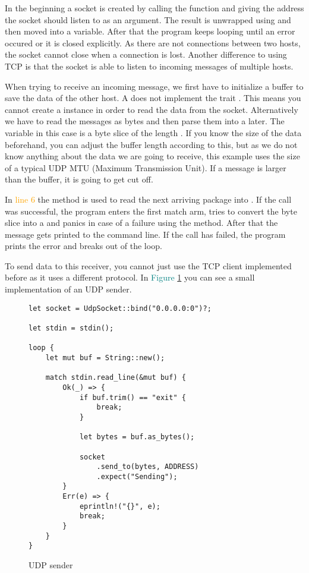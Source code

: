 In the beginning a socket is created by calling the  function and giving the address the socket should listen
to as an argument. The result is unwrapped using  and then moved into a variable. After that the program keeps
looping until an error occured or it is closed explicitly. As there are not connections between two hosts, the socket
cannot close when a connection is lost. Another difference to using TCP is that the socket is able to listen to
incoming messages of multiple hosts.

When trying to receive an incoming message, we first have to initialize a buffer to save the data of the other host.
A  does not implement the trait . This means you cannot create a 
instance in order to read the data from the socket. Alternatively we have to read the messages as bytes and then parse
them into a  later. The variable  in this case is a byte slice of the length . If you
know the size of the data beforehand, you can adjust the buffer length according to this, but as we do not know
anything about the data we are going to receive, this example uses the size of a typical UDP MTU (Maximum Transmission
Unit). If a message is larger than the buffer, it is going to get cut off.

In \textcolor{orange}{line 6} the method  is used to read the next arriving package into . If
the call was successful, the program enters the first match arm, tries to convert the byte slice into a  and
panics in case of a failure using the  method. After that the message gets printed to the command line. If
the call has failed, the program prints the error and breaks out of the loop.

To send data to this receiver, you cannot just use the TCP client implemented before as it uses a different protocol. In
\textcolor{teal}{Figure \ref{udp-sender}} you can see a small implementation of an UDP sender.

\begin{figure}[ht]
    \begin{verbatim}
let socket = UdpSocket::bind("0.0.0.0:0")?;

let stdin = stdin();

loop {
    let mut buf = String::new();

    match stdin.read_line(&mut buf) {
        Ok(_) => {
            if buf.trim() == "exit" {
                break;
            }

            let bytes = buf.as_bytes();

            socket
                .send_to(bytes, ADDRESS)
                .expect("Sending");
        }
        Err(e) => {
            eprintln!("{}", e);
            break;
        }
    }
}
    \end{verbatim}
    \caption{UDP sender}
    \label{udp-sender}
\end{figure}

